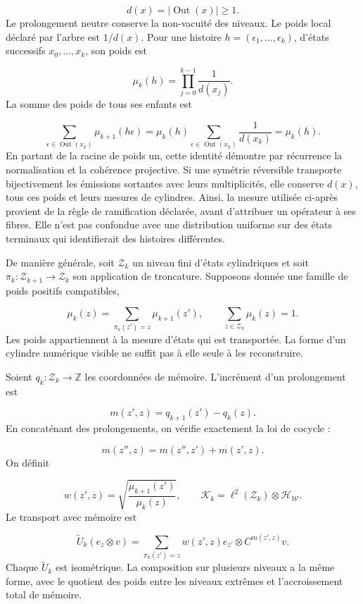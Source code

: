 \[
d(x)=|\operatorname{Out}(x)|\geq1.
\]
Le prolongement neutre conserve la non-vacuité des niveaux. Le poids local déclaré par l'arbre est \(1/d(x)\). Pour une histoire \(h=(\epsilon_1,\ldots,\epsilon_k)\), d'états successifs \(x_0,\ldots,x_k\), son poids est

\[
\mu_k(h)=\prod_{j=0}^{k-1}\frac1{d(x_j)}.
\]
La somme des poids de tous ses enfants est

\[
\sum_{\epsilon\in\operatorname{Out}(x_k)}
\mu_{k+1}(h\epsilon)
=\mu_k(h)\sum_{\epsilon\in\operatorname{Out}(x_k)}\frac1{d(x_k)}
=\mu_k(h).
\]
En partant de la racine de poids un, cette identité démontre par récurrence la normalisation et la cohérence projective. Si une symétrie réversible transporte bijectivement les émissions sortantes avec leurs multiplicités, elle conserve \(d(x)\), tous ces poids et leurs mesures de cylindres. Ainsi, la mesure utilisée ci-après provient de la règle de ramification déclarée, avant d'attribuer un opérateur à ses fibres. Elle n'est pas confondue avec une distribution uniforme sur des états terminaux qui identifierait des histoires différentes.

De manière générale, soit \(\mathcal Z_k\) un niveau fini d'états cylindriques et soit \(\pi_k:\mathcal Z_{k+1}\to\mathcal Z_k\) son application de troncature. Supposons donnée une famille de poids positifs compatibles,

\[
\mu_k(z)=\sum_{\pi_k(z')=z}\mu_{k+1}(z'),
\qquad \sum_{z\in\mathcal Z_k}\mu_k(z)=1.
\]
Les poids appartiennent à la mesure d’états qui est transportée. La forme d’un cylindre numérique visible ne suffit pas à elle seule à les reconstruire.

Soient \(q_k:\mathcal Z_k\to\mathbb Z\) les coordonnées de mémoire. L'incrément d'un prolongement est

\[
m(z',z)=q_{k+1}(z')-q_k(z).
\]
En concaténant des prolongements, on vérifie exactement la loi de cocycle :

\[
m(z'',z)=m(z'',z')+m(z',z).
\]
On définit

\[
w(z',z)=
\sqrt{\frac{\mu_{k+1}(z')}{\mu_k(z)}},
\qquad
\mathcal K_k=\ell^2(\mathcal Z_k)\otimes\mathcal H_{\mathscr W}.
\]
Le transport avec mémoire est

\[
\widetilde U_k(e_z\otimes v)
=\sum_{\pi_k(z')=z}w(z',z)e_{z'}\otimes C^{m(z',z)}v.
\]
Chaque \(\widetilde U_k\) est isométrique. La composition sur plusieurs niveaux a la même forme, avec le quotient des poids entre les niveaux extrêmes et l’accroissement total de mémoire.


